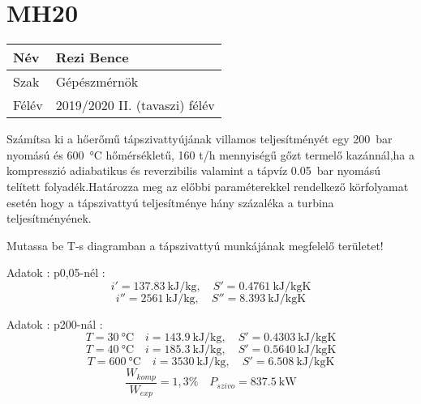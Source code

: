 \section*{MH20}
\begin{tabular}{ | p{2cm} | p{14cm} | } 
	\hline
	Név & Rezi Bence \\ 
	\hline
	Szak & Gépészmérnök \\ 
	\hline
	Félév & 2019/2020 II. (tavaszi) félév \\ 
	\hline
\end{tabular}
\vspace{0.5cm}

\noindent 	Számítsa ki a hőerőmű tápszivattyújának villamos teljesítményét egy \SI{200}{\bar} nyomású és \SI{600}{\celsius} hőmérsékletű, 160 t/h mennyiségű gőzt termelő kazánnál,ha a kompresszió adiabatikus és reverzibilis valamint a tápvíz \SI{0,05}{\bar} nyomású telített folyadék.Határozza meg az előbbi paraméterekkel rendelkező körfolyamat esetén hogy a tápszivattyú teljesítménye hány százaléka a turbina teljesítményének.

\vspace{2mm}
\noindent Mutassa be T-s diagramban a tápszivattyú munkájának megfelelő területet! 

\vspace{5mm}
\noindent Adatok : p0,05-nél :
\begin{equation*}
	i' = \SI{137,83}{\kilo\joule\per\kilogram},
	\quad
	S' = \SI{0,4761}{\kilo\joule\per\kilogram\kelvin}
\end{equation*}
\begin{equation*}
	i'' = \SI{2561}{\kilo\joule\per\kilogram},
	\quad
	S'' = \SI{8,393}{\kilo\joule\per\kilogram\kelvin}
\end{equation*}

\vspace{2mm}
\noindent Adatok : p200-nál :
\begin{equation*}
	T  =\SI{30}{\celsius}
	\quad
	i = \SI{143,9}{\kilo\joule\per\kilogram},
	\quad
	S' = \SI{0,4303}{\kilo\joule\per\kilogram\kelvin}
\end{equation*}
\begin{equation*}
	T  =\SI{40}{\celsius}
	\quad
	i = \SI{185,3}{\kilo\joule\per\kilogram},
	\quad
	S' = \SI{0,5640}{\kilo\joule\per\kilogram\kelvin}
\end{equation*}
\begin{equation*}
	T  =\SI{600}{\celsius}
	\quad
	i = \SI{3530}{\kilo\joule\per\kilogram},
	\quad
	S' = \SI{6,508}{\kilo\joule\per\kilogram\kelvin}
\end{equation*}
\vspace{5mm}
\begin{equation}
	\frac{W_{komp}}{W_{exp}}=1,3 \%
	\quad
    P_{szivo} =\SI{837,5}{\kilo\watt}
	\end{equation}

